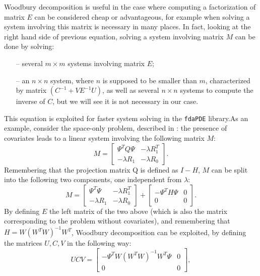 Woodbury decomposition is useful in the case where computing a factorization of
matrix $E$ can be considered cheap or advantageous, for example when solving a
system involving this matrix is necessary in many places. In fact, looking at
the right hand side of previous equation, solving a system involving matrix $M$
can be done by solving:
\begin{itemize}
	\item[--]several $m \times m$ systems involving matrix $E$;
	\item[--]an $n \times n$ system, where $n$ is supposed to be smaller than $m$, characterized by matrix
	$ \left( C^{-1} + V E^{-1}U \right)$, as well as several $n \times n$ systems to compute the
	inverse of $C$, but we will see it is not necessary in our case.
\end{itemize}
This equation is exploited for faster system solving in the
\verb|fdaPDE| library.\newline As an example, consider the space-only problem,
described \eg in \cite{sangalli1}: the presence of covariates leads to a linear
system involving the following matrix $M$:
\begin{equation*}
	M =
	\begin{bmatrix}
		\Psi^TQ\Psi  & -\lambda R_1^T \\
		-\lambda R_1 & -\lambda R_0
	\end{bmatrix}
	.
\end{equation*} Remembering that the projection matrix Q is defined as $I-H$, $M$
can be split into the following two components, one independent from $\lambda$:
\begin{equation*}
	M =
	\begin{bmatrix}
		\Psi^T\Psi   & -\lambda R_1^T \\
		-\lambda R_1 & -\lambda R_0
	\end{bmatrix}
	+
	\begin{bmatrix}
		-\Psi^TH\Psi & 0 \\
		0            & 0
	\end{bmatrix}
	.
\end{equation*} By defining $E$ the left matrix of the two above (which is also the
matrix corresponding to the problem without covariates), and remembering that
$H = W\left(W^TW\right)^{-1}W^T$, Woodbury decomposition can be exploited, by
defining the matrices $U, C, V$ in the following way:
\begin{equation*}
	UCV=
	\begin{bmatrix}
		-\Psi^TW\left(W^TW\right)^{-1}W^T\Psi & 0 \\
		0                                     & 0
	\end{bmatrix}
	,
\end{equation*}
